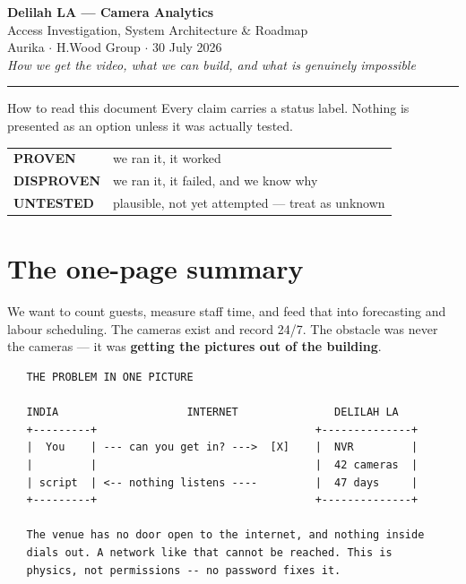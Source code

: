 \documentclass[11pt,a4paper]{article}
\begin{document}
\begin{center}
{\Huge\bfseries\color{brass} Delilah LA — Camera Analytics}\\[6pt]
{\large Access Investigation, System Architecture \& Roadmap}\\[10pt]
{\small Aurika $\cdot$ H.Wood Group $\cdot$ 30 July 2026}\\[4pt]
{\small\itshape How we get the video, what we can build, and what is genuinely impossible}
\end{center}

\vspace{6pt}\hrule\vspace{14pt}

\begin{note}{How to read this document}
Every claim carries a status label. Nothing is presented as an option unless
it was actually tested.

\vspace{4pt}
\begin{tabular}{ll}
\textcolor{ok}{\textbf{PROVEN}}      & we ran it, it worked \\
\textcolor{bad}{\textbf{DISPROVEN}}  & we ran it, it failed, and we know why \\
\textcolor{warn}{\textbf{UNTESTED}}  & plausible, not yet attempted --- treat as unknown \\
\end{tabular}
\end{note}

\section{The one-page summary}

We want to count guests, measure staff time, and feed that into forecasting
and labour scheduling. The cameras exist and record 24/7. The obstacle was
never the cameras --- it was \textbf{getting the pictures out of the building}.

\begin{verbatim}
   THE PROBLEM IN ONE PICTURE

   INDIA                    INTERNET               DELILAH LA
   +---------+                                  +--------------+
   |  You    | --- can you get in? --->  [X]    |  NVR         |
   |         |                                  |  42 cameras  |
   | script  | <-- nothing listens ----         |  47 days     |
   +---------+                                  +--------------+

   The venue has no door open to the internet, and nothing inside
   dials out. A network like that cannot be reached. This is
   physics, not permissions -- no password fixes it.
\end{verbatim}
\end{document}
